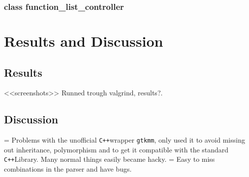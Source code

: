 \documentclass[a4paper,11pt]{kth-mag}
\newcommand{\Cpp}{\texttt{C++}}
\newcommand{\Gtkmm}{\texttt{gtkmm}}
\begin{document}
\subsection{class function\_list\_controller}



\chapter{Results and Discussion}

\section{Results}
<<screenshots>>
Runned trough valgrind, results?.

\section{Discussion}
 = Problems with the unofficial \Cpp wrapper \Gtkmm, only used it to avoid
 missing out inheritance, polymorphism and to get it compatible with the
 standard \Cpp Library. Many normal things easily became hacky. 
 = Easy to miss combinations in the parser and have bugs.
\end{document}
